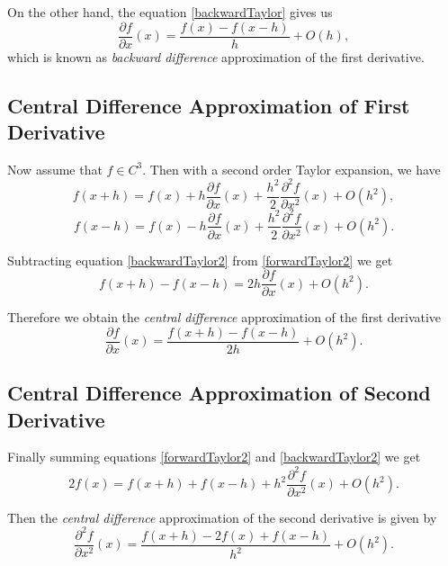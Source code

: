 On the other hand, the equation \eqref{backwardTaylor} gives us
\begin{equation}\label{bwd}
\frac{\partial f}{\partial x}(x) =  \frac{f(x)-f(x-h)}{h} + O(h),
\end{equation}
which is known as \textit{backward difference} approximation of the first derivative.

\subsection{Central Difference Approximation of First Derivative}
Now assume that $f\in C^3$. Then with a second order Taylor expansion, we have
\begin{equation}\label{forwardTaylor2}
f(x+h) = f(x) + h \frac{\partial f}{\partial x}(x) + \frac{h^2}{2}\frac{\partial^2 f}{\partial x^2}(x) +O(h^2),
\end{equation}
\begin{equation}\label{backwardTaylor2}
f(x-h) = f(x) - h \frac{\partial f}{\partial x}(x) + \frac{h^2}{2}\frac{\partial^2 f}{\partial x^2}(x) +O(h^2).
\end{equation}

Subtracting equation \eqref{backwardTaylor2} from  \eqref{forwardTaylor2} we get
$$ f(x+h)-f(x-h) = 2h \frac{\partial f}{\partial x}(x) + O(h^2).$$

Therefore we obtain the \textit{central difference} approximation of the first derivative
\begin{equation}\label{cf1}
\frac{\partial f}{\partial x}(x) = \frac{f(x+h)-f(x-h)}{2h} + O(h^2).
\end{equation}

\subsection{Central Difference Approximation of Second Derivative}
Finally summing equations \eqref{forwardTaylor2} and \eqref{backwardTaylor2} we get
$$2f(x) = f(x+h)+f(x-h)+ h^2 \frac{\partial^2 f}{\partial x^2}(x) + O(h^2).$$ 

Then the \textit{central difference} approximation of the second derivative is given by
\begin{equation}\label{cf2}
\frac{\partial^2 f}{\partial x^2}(x) = \frac{f(x+h)-2f(x)+f(x-h)}{h^2}+O(h^2).
\end{equation}


